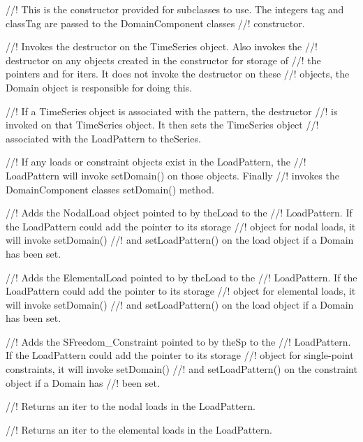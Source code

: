 //! This is the constructor provided for subclasses to use. The integers
\p tag and \p classTag are passed to the DomainComponent classes
//! constructor. 

//! Invokes the destructor on the TimeSeries object. Also invokes the
//! destructor on any objects created in the constructor for storage of
//! the pointers and for iters. It does not invoke the destructor on these
//! objects, the Domain object is responsible for doing this.

//! If a TimeSeries object is associated with the pattern, the destructor
//! is invoked on that TimeSeries object. It then sets the TimeSeries object
//! associated with the LoadPattern to \p theSeries.

//! If any loads or constraint objects exist in the LoadPattern, the
//! LoadPattern will invoke setDomain() on those objects. Finally
//! invokes the DomainComponent classes setDomain() method.

//! Adds the NodalLoad object pointed to by \p theLoad to the
//! LoadPattern. If the LoadPattern could add the pointer to its storage
//! object for nodal loads, it will invoke setDomain()
//! and setLoadPattern() on the load object if a Domain has been set.

//! Adds the ElementalLoad pointed to by \p theLoad to the
//! LoadPattern. If the LoadPattern could add the pointer to its storage
//! object for elemental loads, it will invoke setDomain()
//! and setLoadPattern() on the load object if a Domain has been set.

//! Adds the SFreedom\_Constraint pointed to by \p theSp to the
//! LoadPattern. If the LoadPattern could add the pointer to its storage
//! object for single-point constraints, it will invoke setDomain()
//! and setLoadPattern() on the constraint object if a Domain has
//! been set.

//! Returns an iter to the nodal loads in the LoadPattern.

//! Returns an iter to the elemental loads in the LoadPattern.

